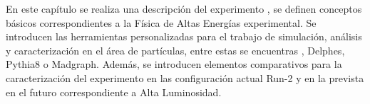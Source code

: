 %

En este capítulo se realiza una descripción del experimento \CMS, se definen conceptos básicos correspondientes a la Física de Altas Energías experimental. Se introducen las herramientas personalizadas para el trabajo de simulación, análisis y caracterización en el área de partículas, entre estas se encuentras \ROOT, {Delphes}, {Pythia8} o {Madgraph}. Además, se introducen elementos comparativos para la caracterización del experimento en las configuración actual Run-2 y en la prevista en el futuro correspondiente a Alta Luminosidad.





